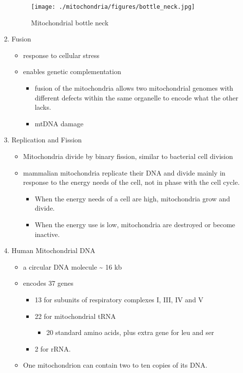 \documentclass{scrartcl}
\begin{document}
\begin{enumerate}
\begin{figure}[htbp]
\centering
\texttt{[image: ./mitochondria/figures/bottle\_neck.jpg]}
\caption[bottle]{\label{fig:org8f7888d}
Mitochondrial bottle neck}
\end{figure}

\item Fusion
\label{sec:org7dc7970}
\begin{itemize}
\item response to cellular stress
\item enables genetic complementation
\begin{itemize}
\item fusion of the mitochondria allows two mitochondrial genomes with
different defects within the same organelle to encode what the
other lacks.
\item mtDNA damage
\end{itemize}
\end{itemize}

\item Replication and Fission
\label{sec:org6430f11}
\begin{itemize}
\item Mitochondria divide by binary fission, similar to bacterial cell division
\item mammalian mitochondria replicate their DNA and divide mainly in response
to the energy needs of the cell, not in phase with the cell cycle.
\begin{itemize}
\item When the energy needs of a cell are high, mitochondria grow and
divide.
\item When the energy use is low, mitochondria are destroyed
or become inactive.
\end{itemize}
\end{itemize}
\item Human Mitochondrial DNA
\label{sec:org2d6c260}
\begin{itemize}
\item a circular DNA molecule \textasciitilde{} 16 kb
\item encodes 37 genes
\begin{itemize}
\item 13 for subunits of respiratory complexes I, III, IV and V
\item 22 for mitochondrial tRNA
\begin{itemize}
\item 20 standard amino acids, plus extra gene for leu and ser
\end{itemize}
\item 2 for rRNA.
\end{itemize}
\item One mitochondrion can contain two to ten copies of its DNA.
\end{itemize}


\end{enumerate}
\end{document}
